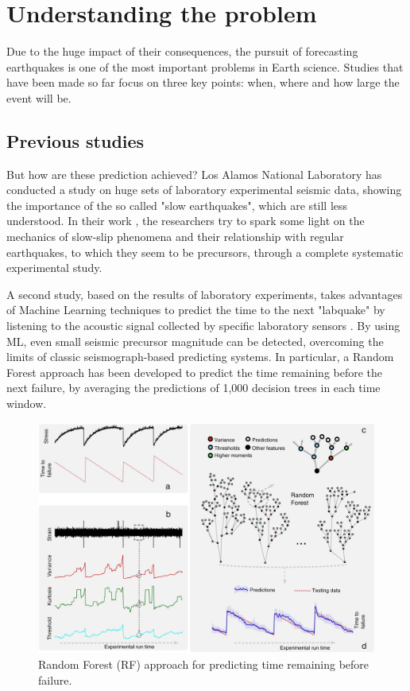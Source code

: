\chapter{Understanding the problem}
\label{Introduzione}
\thispagestyle{empty}

\noindent Due to the huge impact of their consequences, the pursuit of forecasting earthquakes is one of the most important problems in Earth science. Studies that have been made so far focus on three key points: when, where and how large the event will be.

\section{Previous studies}
But how are these prediction achieved? Los Alamos National Laboratory has conducted a study on huge sets of laboratory experimental seismic data, showing the importance of the so called "slow earthquakes", which are still less understood. In their work \cite{sloweq}, the researchers try to spark some light on the mechanics of slow-slip phenomena and their relationship with regular earthquakes, to which they seem to be precursors, through a complete systematic experimental study.

\bigbreak

A second study, based on the results of laboratory experiments, takes advantages of Machine Learning techniques to predict the time to the next "labquake" by listening to the acoustic signal collected by specific laboratory sensors \cite{mleq}. By using ML, even small seismic precursor magnitude can be detected, overcoming the limits of classic seismograph-based predicting systems. In particular, a Random Forest approach has been developed to predict the time remaining before the next failure, by averaging the predictions of 1,000 decision trees in each time window.

\begin{figure} [h]
	\centering
	\includegraphics[width=0.7\linewidth]{pictures/grl56367-fig-0001-m.jpg}
	\caption{Random Forest (RF) approach for predicting time remaining before failure.}
	\label{fig:RF1}
\end{figure}

